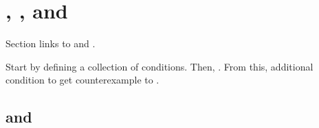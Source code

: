 




\section{, \qWhyV{}, and \issueConstraint{}}
\label{sec:comining-ingredients}

\begin{note}
  Section links  to \qWhyV{} and \issueConstraint{}.

  Start by defining a collection of conditions.
  Then, \qWhy{}.
  From this, additional condition to get counterexample to \issueConstraint{}.
\end{note}

\subsection{ and \qWhyV{}}


